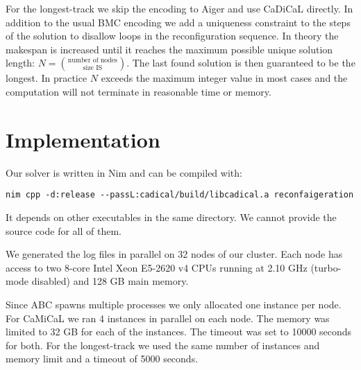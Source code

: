 \documentclass[11pt]{article}
\begin{document}
\thispagestyle{empty}
For the longest-track we skip the encoding to Aiger and use CaDiCaL directly. In addition to the usual BMC encoding we add a uniqueness constraint to the steps of the solution to disallow loops in the reconfiguration sequence. In theory the makespan is increased until it reaches the maximum possible unique solution length:
\(N = \binom{\text{number of nodes}}{\text{size IS}}.\)
The last found solution is then guaranteed to be the longest.
In practice \(N\) exceeds the maximum integer value in most cases and the computation will not terminate in reasonable time or memory.
\section*{Implementation}
\thispagestyle{empty}
\label{sec:orgaf79f39}
Our solver is written in Nim and can be compiled with:
\begin{verbatim}
nim cpp -d:release --passL:cadical/build/libcadical.a reconfaigeration
\end{verbatim}
It depends on other executables in the same directory. We cannot provide the source code for all of them.

We generated the log files
in parallel on 32 nodes of our cluster.
Each node has access to two 8-core Intel Xeon E5-2620 v4 CPUs running at 2.10 GHz
(turbo-mode disabled) and 128 GB main memory.

Since ABC spawns multiple processes we only allocated one instance per node. For CaMiCaL we ran 4 instances in parallel on each node. The memory was limited to 32 GB for each of the instances. The timeout was set to 10000 seconds for both.
For the longest-track we used the same number of instances and memory limit and a timeout of 5000 seconds.
\printbibliography
\end{document}
